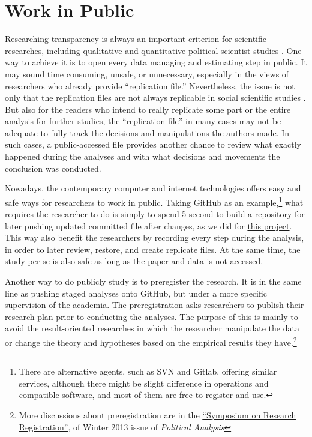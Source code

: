 
\section{Work in Public}

Researching transparency is always an important criterion for scientific researches, including qualitative and quantitative political scientist studies \citep{Appadurai2000,Denzin2009}. One way to achieve it is to open every data managing and estimating step in public. It may sound time consuming, unsafe, or unnecessary, especially in the views of researchers who already provide ``replication file.'' Nevertheless, the issue is not only that the replication files are not always replicable in social scientific studies \citep{Chang2015,Jacoby2015,OpenScienceCollaboration2015}. But also for the readers who intend to really replicate some part or the entire analysis for further studies, the ``replication file'' in many cases may not be adequate to fully track the decisions and manipulations the authors made. In such cases, a public-accessed file provides another chance to review what exactly happened during the analyses and with what decisions and movements the conclusion was conducted. 

Nowadays, the contemporary computer and internet technologies offers easy and safe ways for researchers to work in public. Taking GitHub as an example,\footnote{There are alternative agents, such as SVN and Gitlab, offering similar services, although there might be slight difference in operations and compatible software, and most of them are free to register and use.} what requires the researcher to do is simply to spend 5 second to build a repository for later pushing updated committed file after changes, as we did for \href{https://github.com/fsolt/meritocracy-rep}{this project}. This way also benefit the researchers by recording every step during the analysis, in order to later review, restore, and create replicate files. At the same time, the study per se is also safe as long as the paper and data is not accessed. 

Another way to do publicly study is to preregister the research. It is in the same line as pushing staged analyses onto GitHub, but under a more specific supervision of the academia. The preregistration asks researchers to publish their research plan prior to conducting the analyses. The purpose of this is mainly to avoid the result-oriented researches in which the researcher manipulate the data or change the theory and hypotheses based on the empirical results they have.\footnote{More discussions about preregistration are in the \href{http://pan.oxfordjournals.org/content/21/1.toc}{``Symposium on Research Registration''}, of Winter 2013 issue of \textit{Political Analysis}}


